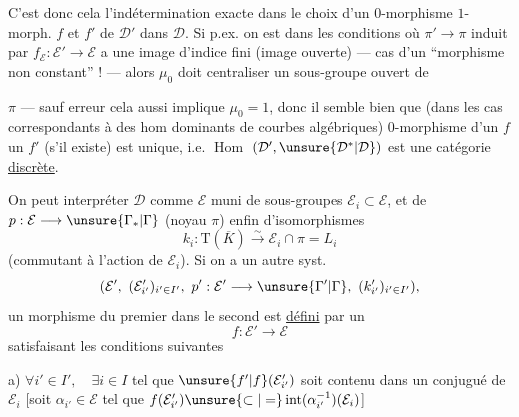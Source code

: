 C'est donc cela l'indétermination exacte dans le choix d'un $0$-morphisme  $1$-morph.  $f$ et $f'$ de $\mathcal D'$ dans $\mathcal D$.
Si p.ex. on est dans les conditions où
$\pi'\longrightarrow\pi$ induit par $f_{\mathcal E}:\mathcal E'\longrightarrow\mathcal E$  a une image d'indice fini (image ouverte)
--- cas d'un ``morphisme non constant'' ! ---
alors $\mu_0$ doit centraliser un sous-groupe ouvert de

$\pi$ --- sauf erreur cela aussi implique $\mu_0=1$, donc il semble bien que  (dans les cas correspondants à des hom dominants de courbes algébriques)   $0$-morphisme d'un $f$  un $f'$ (s'il existe) est unique, i.e. \uline{$\operatorname{Hom}$} $(\mathcal D',\unsure{\mathcal D^*|\mathcal D})$ est une catégorie \uline{discrète}.

On peut interpréter $\mathcal D$ comme $\mathcal E$ muni de sous-groupes $\mathcal E_i\subset\mathcal E$, et de $p:\mathcal E\longrightarrow\unsure{\Gamma_*|\Gamma}$ (noyau $\pi$) enfin d'isomorphismes
\[
k_i:\mathrm T(\overline K)\xrightarrow{\sim}\mathcal E_i\cap\pi=L_i
\]
(commutant à l'action de $\mathcal E_i$).
Si on a un autre syst.
\[
(\mathcal E',\ (\mathcal E'_{i'})_{i'\in I'},\ p':\mathcal E'\longrightarrow\unsure{\Gamma'|\Gamma},\ (k'_{i'})_{i'\in I'}),
\]
un morphisme du premier dans le second est \uline{défini} par un
\[
f:\mathcal E'\longrightarrow\mathcal E
\]
satisfaisant les conditions suivantes


a) $\forall i'\in I',\quad\exists i\in I$ tel que $\unsure{f'|f}(\mathcal E'_{i'})$ soit contenu dans un conjugué de $\mathcal E_i$
[soit $\alpha_{i'}\in\mathcal E$ tel que
$f(\mathcal E'_{i'})\unsure{\subset|=}\operatorname{int}(\alpha_{i'}^{-1})(\mathcal E_i)$]

